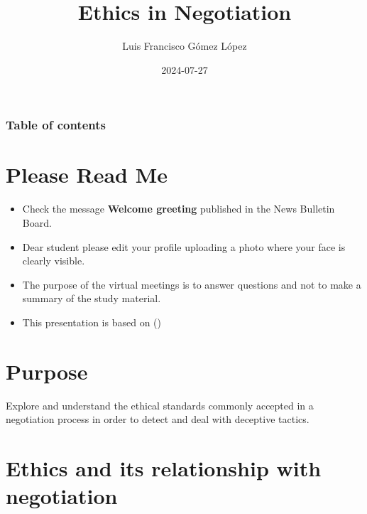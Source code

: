 \documentclass[
  ignorenonframetext,
]{beamer}
\title{Ethics in Negotiation}
\author{Luis Francisco Gómez López}
\date{2024-07-27}
\institute{FAEDIS}
\renewcommand*\contentsname{Table of contents}
\newcommand\contentsname{Table of contents}
\begin{document}
\frame{\titlepage}

\renewcommand*\contentsname{Table of contents}
\begin{frame}[allowframebreaks]
  \frametitle{Table of contents}
  \tableofcontents[hideallsubsections]
\end{frame}

\section{Please Read Me}\label{please-read-me}

\begin{frame}{}
\label{section}
\begin{itemize}
\item
  Check the message \textbf{Welcome greeting} published in the News
  Bulletin Board.
\item
  Dear student please edit your profile uploading a photo where your
  face is clearly visible.
\item
  The purpose of the virtual meetings is to answer questions and not to
  make a summary of the study material.
\item
  This presentation is based on
  ()
\end{itemize}
\end{frame}

\section{Purpose}\label{purpose}

\begin{frame}{}
\label{section-1}
Explore and understand the ethical standards commonly accepted in a
negotiation process in order to detect and deal with deceptive tactics.
\end{frame}

\section{Ethics and its relationship with
negotiation}\label{ethics-and-its-relationship-with-negotiation}
\end{document}
